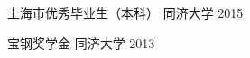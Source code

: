 


\begin{cvhonors}

\cvhonor
{上海市优秀毕业生（本科）} %
{} %
{同济大学} %
{2015} %


\cvhonor
{宝钢奖学金} %
{} %
{同济大学} %
{2013} %


\end{cvhonors}